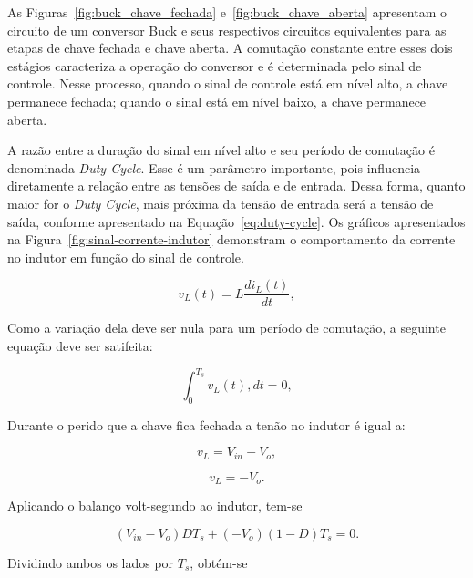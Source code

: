 As Figuras~\ref{fig:buck_chave_fechada} e~\ref{fig:buck_chave_aberta} apresentam o circuito de um conversor Buck e seus respectivos circuitos equivalentes para as etapas de chave fechada e chave aberta. A comutação constante entre esses dois estágios caracteriza a operação do conversor e é determinada pelo sinal de controle. Nesse processo, quando o sinal de controle está em nível alto, a chave permanece fechada; quando o sinal está em nível baixo, a chave permanece aberta.

A razão entre a duração do sinal em nível alto e seu período de comutação é denominada \textit{Duty Cycle}. Esse é um parâmetro importante, pois influencia diretamente a relação entre as tensões de saída e de entrada. Dessa forma, quanto maior for o \textit{Duty Cycle}, mais próxima da tensão de entrada será a tensão de saída, conforme apresentado na Equação~\ref{eq:duty-cycle}. Os gráficos apresentados na Figura~\ref{fig:sinal-corrente-indutor} demonstram o comportamento da corrente no indutor em função do sinal de controle.



\begin{equation}
v_L(t) = L\frac{di_L(t)}{dt},
\end{equation}

Como a variação dela deve ser nula para um período de comutação, a seguinte equação deve ser satifeita:

\begin{equation}
\int_0^{T_s} v_L(t),dt = 0,
\end{equation}

Durante o perido que a chave fica fechada a tenão no indutor é igual a:

\begin{equation}
v_L = V_{in} - V_o,
\end{equation}

\begin{equation}
v_L = -V_o.
\end{equation}

Aplicando o balanço volt-segundo ao indutor, tem-se

\begin{equation}
(V_{in}-V_o)DT_s + (-V_o)(1-D)T_s = 0.
\end{equation}

Dividindo ambos os lados por $T_s$, obtém-se


